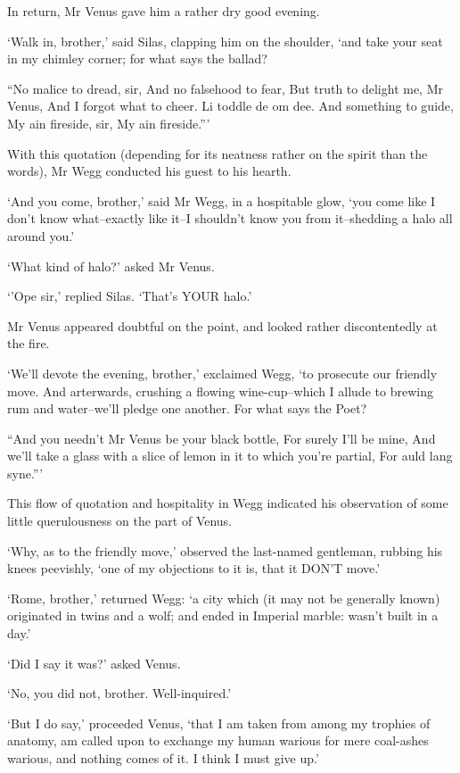 In return, Mr Venus gave him a rather dry good evening.

‘Walk in, brother,’ said Silas, clapping him on the shoulder, ‘and take
your seat in my chimley corner; for what says the ballad?

     “No malice to dread, sir,
     And no falsehood to fear,
     But truth to delight me, Mr Venus,
     And I forgot what to cheer.
     Li toddle de om dee.
     And something to guide,
     My ain fireside, sir,
     My ain fireside.”’

With this quotation (depending for its neatness rather on the spirit
than the words), Mr Wegg conducted his guest to his hearth.

‘And you come, brother,’ said Mr Wegg, in a hospitable glow, ‘you come
like I don’t know what--exactly like it--I shouldn’t know you from
it--shedding a halo all around you.’

‘What kind of halo?’ asked Mr Venus.

‘’Ope sir,’ replied Silas. ‘That’s YOUR halo.’

Mr Venus appeared doubtful on the point, and looked rather
discontentedly at the fire.

‘We’ll devote the evening, brother,’ exclaimed Wegg, ‘to prosecute our
friendly move. And arterwards, crushing a flowing wine-cup--which I
allude to brewing rum and water--we’ll pledge one another. For what says
the Poet?

     “And you needn’t Mr Venus be your black bottle,
     For surely I’ll be mine,
     And we’ll take a glass with a slice of lemon in it to which
     you’re partial,
     For auld lang syne.”’

This flow of quotation and hospitality in Wegg indicated his observation
of some little querulousness on the part of Venus.

‘Why, as to the friendly move,’ observed the last-named gentleman,
rubbing his knees peevishly, ‘one of my objections to it is, that it
DON’T move.’

‘Rome, brother,’ returned Wegg: ‘a city which (it may not be generally
known) originated in twins and a wolf; and ended in Imperial marble:
wasn’t built in a day.’

‘Did I say it was?’ asked Venus.

‘No, you did not, brother. Well-inquired.’

‘But I do say,’ proceeded Venus, ‘that I am taken from among my trophies
of anatomy, am called upon to exchange my human warious for mere
coal-ashes warious, and nothing comes of it. I think I must give up.’

